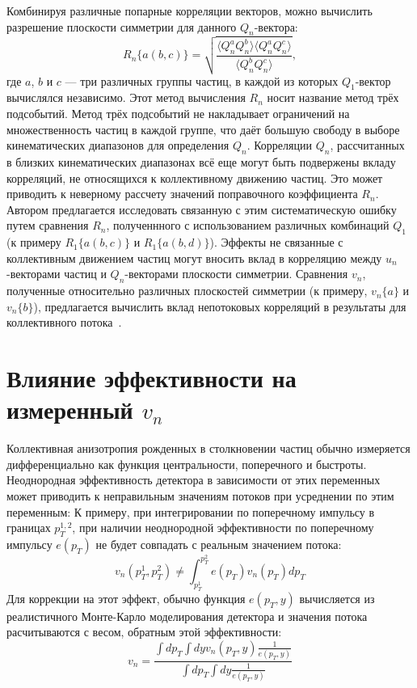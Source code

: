Комбинируя различные попарные корреляции векторов, можно вычислить разрешение плоскости симметрии для данного $Q_n$-вектора:
%
\begin{equation}
    R_n\{a(b,c)\}  =  \sqrt { \frac{ \langle Q_n^a Q_n^b \rangle \langle Q_n^a Q_n^c \rangle }{ \langle Q_n^b Q_n^c \rangle} },
\end{equation}
%
где $a$, $b$ и $c$ --- три различных группы частиц, в каждой из которых $Q_1$-вектор вычислялся независимо.
Этот метод вычисления $R_n$ носит название метод трёх подсобытий.
Метод трёх подсобытий не накладывает ограничений на множественность частиц в каждой группе, что даёт большую свободу в выборе кинематических диапазонов для определения $Q_n$.
Корреляции $Q_n$, рассчитанных в близких кинематических диапазонах всё еще могут быть подвержены вкладу корреляций, не относящихся к коллективному движению частиц.
Это может приводить к неверному рассчету значений поправочного коэффициента $R_n$.
Автором предлагается исследовать связанную с этим систематическую ошибку путем сравнения $R_n$, полученнного с использованием различных комбинаций $Q_1$ (к примеру $R_1\{a(b,c)\}$ и $R_1\{a(b,d)\}$).
Эффекты не связанные с коллективным движением частиц могут вносить вклад в корреляцию между $u_n$-векторами частиц и $Q_n$-векторами плоскости симметрии.
Сравнения $v_n$, полученные относительно различных плоскостей симметрии (к примеру, $v_n\{a\}$ и $v_n\{b\}$), предлагается вычислить вклад непотоковых корреляций в результаты для коллективного потока~\cite{Mamaev:2020qom,Mamaev:2023fpr,Mamaev:2023yhz,Mamaev:2024}. 

\section{Влияние эффективности на измеренный $v_n$}

Коллективная анизотропия рожденных в столкновении частиц обычно измеряется дифференциально как функция центральности, поперечного и быстроты.
Неоднородная эффективность детектора в зависимости от этих переменных может приводить к неправильным значениям потоков при усреднении по этим переменным:
К примеру, при интегрировании по поперечному импульсу в границах $p_T^{1,2}$, при наличии неоднородной эффективности по поперечному импульсу $e(p_T)$ не будет совпадать с реальным значением потока:
%
\begin{equation}
    v_n( p_T^{1}, p_T^{2} ) \ne \int_{p_T^1}^{p_T^2} e(p_T) v_n(p_T) dp_T 
    \label{eq:v1_formula}
\end{equation}
Для коррекции на этот эффект, обычно функция $e(p_T, y)$ вычисляется из реалистичного Монте-Карло моделирования детектора и значения потока расчитываются с весом, обратным этой эффективности:
%
\begin{equation}
    v_n = \frac{\int dp_T \int dy v_n(p_T, y) \frac{1}{e(p_T, y)} }{\int dp_T \int dy \frac{1}{e(p_T, y)} } 
    \label{eq:v1_formula}
\end{equation}

